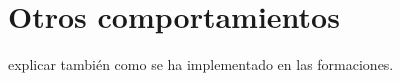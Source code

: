 \medskip
\section{Otros comportamientos}

explicar también como se ha implementado en las formaciones.